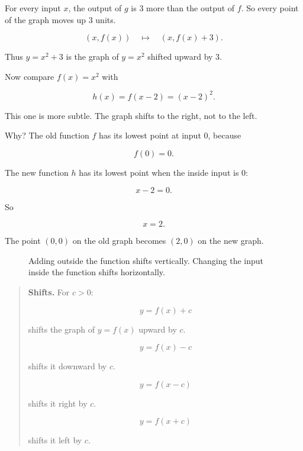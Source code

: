 For every input \(x\), the output of \(g\) is \(3\) more than the output of \(f\). So every point of the graph moves up \(3\) units.

\[
(x,f(x))
\quad\longmapsto\quad
(x,f(x)+3).
\]

Thus \(y=x^2+3\) is the graph of \(y=x^2\) shifted upward by \(3\).

Now compare \(f(x)=x^2\) with

\[
h(x)=f(x-2)=(x-2)^2.
\]

This one is more subtle. The graph shifts to the right, not to the left.

Why? The old function \(f\) has its lowest point at input \(0\), because

\[
f(0)=0.
\]

The new function \(h\) has its lowest point when the inside input is \(0\):

\[
x-2=0.
\]

So

\[
x=2.
\]

The point \((0,0)\) on the old graph becomes \((2,0)\) on the new graph.

\begin{figure}[h]
\centering
{}
\caption{Adding outside the function shifts vertically. Changing the input inside the function shifts horizontally.}
\label{fig:vertical-horizontal-shifts}
\end{figure}

\begin{quote}
\textbf{Shifts.}
For \(c>0\):

\[
y=f(x)+c
\]

shifts the graph of \(y=f(x)\) upward by \(c\).

\[
y=f(x)-c
\]

shifts it downward by \(c\).

\[
y=f(x-c)
\]

shifts it right by \(c\).

\[
y=f(x+c)
\]

shifts it left by \(c\).
\end{quote}

